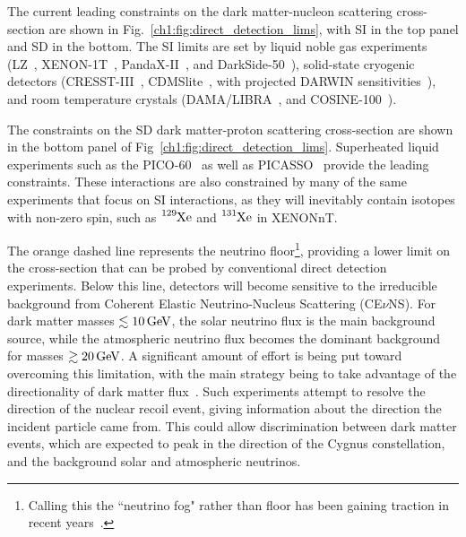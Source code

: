 The current leading constraints on the dark matter-nucleon scattering cross-section
are shown in Fig.~\ref{ch1:fig:direct_detection_lims}, with SI in the top panel and SD in the bottom.
The SI limits are set by liquid noble gas experiments (LZ~\cite{LZ:2022lsv_jul_FirstDarkMatter}, 
XENON-1T~\cite{XENON:2020gfr_mar_SearchCoherentElastic}, PandaX-II~\cite{PandaX-4T:2021bab_dec_DarkMatterSearch},
and DarkSide-50~\cite{DarkSide:2022dhx_mar_SearchDarkMatterNucleon}), solid-state cryogenic detectors (CRESST-III~\cite{CRESST:2019jnq_nov_FirstresultsCRESSTIII}, CDMSlite~\cite{SuperCDMS:2023sql_jun_SearchLowmassDark}, with projected DARWIN sensitivities~\cite{Aalbers:2022dzr_dec_Nextgenerationliquidxenon}), 
and room temperature crystals (DAMA/LIBRA~\cite{Savage:2008er_CompatibilityDAMALIBRA}, and COSINE-100~\cite{COSINE-100:2021xqn_nov_StrongconstraintsCOSINE100}). 

The constraints on the SD dark matter-proton scattering cross-section are shown in the bottom panel of Fig~\ref{ch1:fig:direct_detection_lims}. 
Superheated liquid experiments such as the PICO-60~\cite{PICO:2019vsc_jul_Darkmattersearch} as well as PICASSO~\cite*{Behnke:2016lsk_apr_FinalResultsPICASSO} provide the leading constraints. 
These interactions are also constrained by many of the same experiments that focus on SI interactions, as they will inevitably contain isotopes with non-zero spin, such as $\ce{^{129} Xe}$ and $\ce{^{131} Xe}$ in XENONnT. 

The orange dashed line represents the neutrino floor\footnote{Calling this the ``neutrino fog" rather than floor has been gaining traction in recent years~\cite{OHare:2021utq_dec_Foghorizonnew}.}, providing a lower limit on the cross-section that can be probed by conventional direct detection experiments. Below this line, detectors will become sensitive to the irreducible background from Coherent Elastic Neutrino-Nucleus Scattering (CE$\nu$NS). For dark matter masses $\lesssim 10{\rm \,GeV}$, the solar neutrino flux is the main background source, while the atmospheric neutrino flux becomes the dominant background for masses $\gtrsim 20{\rm \,GeV}$. 
A significant amount of effort is being put toward overcoming this limitation, with the main strategy being to take advantage of the directionality of dark matter flux~\cite{Grothaus:2014hja_jun_DirectionalDarkMatter}. Such experiments attempt to resolve the direction of the nuclear recoil event, giving information about the direction the incident particle came from. This could allow discrimination between dark matter events, which are expected to peak in the direction of the Cygnus constellation, and the background solar and atmospheric neutrinos. 

